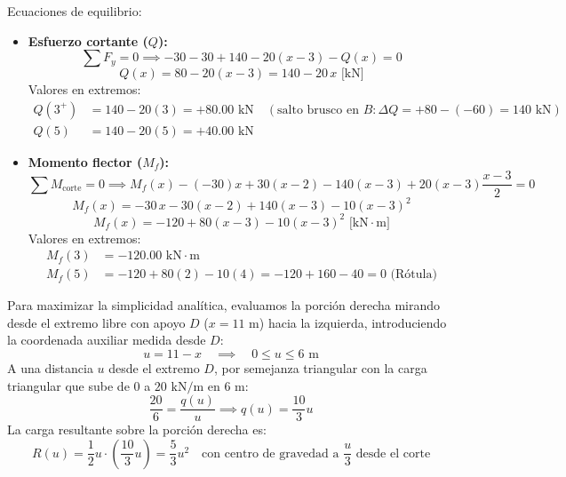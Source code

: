 Ecuaciones de equilibrio:
\begin{itemize}
    \item \textbf{Esfuerzo cortante ($Q$):}
          \begin{equation}
              \sum F_y = 0 \implies -30 - 30 + 140 - 20(x - 3) - Q(x) = 0
          \end{equation}
          \begin{equation}
              \boxed{Q(x) = 80 - 20(x - 3) = 140 - 20\,x\text{ [kN]}}
          \end{equation}
          Valores en extremos:
          \begin{align*}
              Q(3^+) & = 140 - 20(3) = +80.00\text{ kN} \quad (\text{salto brusco en } B: \Delta Q = +80 - (-60) = 140\text{ kN}) \\
              Q(5)   & = 140 - 20(5) = +40.00\text{ kN}
          \end{align*}
    \item \textbf{Momento flector ($M_f$):}
          \begin{equation}
              \sum M_{\text{corte}} = 0 \implies M_f(x) - (-30)x + 30(x - 2) - 140(x - 3) + 20(x - 3)\frac{x - 3}{2} = 0
          \end{equation}
          \begin{equation}
              M_f(x) = -30\,x - 30(x - 2) + 140(x - 3) - 10(x - 3)^2
          \end{equation}
          \begin{equation}
              \boxed{M_f(x) = -120 + 80(x - 3) - 10(x - 3)^2\text{ [kN}\cdot\text{m]}}
          \end{equation}
          Valores en extremos:
          \begin{align*}
              M_f(3) & = -120.00\text{ kN}\cdot\text{m}                             \\
              M_f(5) & = -120 + 80(2) - 10(4) = -120 + 160 - 40 = 0\text{ (Rótula)}
          \end{align*}
\end{itemize}


Para maximizar la simplicidad analítica, evaluamos la porción derecha mirando desde el extremo libre con apoyo $D$ ($x = 11\text{ m}$) hacia la izquierda, introduciendo la coordenada auxiliar medida desde $D$:
\begin{equation}
    u = 11 - x \quad \implies \quad 0 \le u \le 6\text{ m}
\end{equation}
A una distancia $u$ desde el extremo $D$, por semejanza triangular con la carga triangular que sube de $0$ a $20\text{ kN/m}$ en $6\text{ m}$:
\begin{equation}
    \frac{20}{6} = \frac{q(u)}{u} \implies q(u) = \frac{10}{3}u
\end{equation}
La carga resultante sobre la porción derecha es:
\begin{equation}
    R(u) = \frac{1}{2} u \cdot \left(\frac{10}{3}u\right) = \frac{5}{3}u^2 \quad \text{con centro de gravedad a } \frac{u}{3} \text{ desde el corte}
\end{equation}

